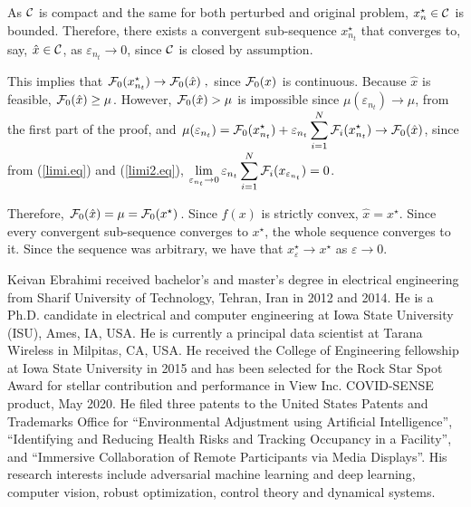 \documentclass[journal,twoside,web]{ieeecolor}
\begin{document}
As ${\cal C}$ is compact and the same for both perturbed and original problem, $x^\star_{n}\in {\cal C}$ is bounded.  Therefore, there exists a convergent sub-sequence $x_{n_t}^\star$ that converges to, say, $\hat{x}\in {\cal C}$, as $\varepsilon_{n_t} \to 0$, since ${\cal C}$ is closed by assumption.

This implies that
${\cal F}_0(x_{n_t}^\star) \to {\cal F}_0(\hat{x})\;,$ since ${\cal F}_0(x)$ is continuous.
Because $\hat{x}$ is feasible, ${\cal F}_0(\hat{x})\geq \mu$.
However,  ${\cal F}_0(\hat{x})>\mu$ is impossible since
$
\mu(\varepsilon_{n_t})\to \mu
$,
from the first part of the proof, and $\displaystyle\mu(\varepsilon_{n_t})={\cal F}_0(x^\star_{n_t})+\varepsilon_{n_t}\sum_{i=1}^N{\cal F}_{i}(x_{n_t}^\star)\to {\cal F}_0(\hat{x})$, since from (\ref{limi.eq}) and (\ref{limi2.eq}), $\displaystyle\lim_{\varepsilon_{n_t}\to 0}
\varepsilon_{n_t}\sum_{i=1}^N{\cal F}_{i}(x_{\varepsilon_{n_t}})=0$\;.

Therefore, ${\cal F}_0(\hat{x})=\mu={\cal F}_0(x^\star)$. Since $f(x)$ is strictly convex, $\hat{x}=x^\star$. Since every convergent sub-sequence converges to $x^\star$, the whole sequence converges to it. Since the sequence was arbitrary, we have that $x^\star_\varepsilon\to x^\star$ as $\varepsilon\to 0$\;.




\begin{IEEEbiography}
{Keivan Ebrahimi} received bachelor's and master's degree in electrical engineering from Sharif University of Technology, Tehran, Iran in 2012 and 2014. He is a Ph.D. candidate in electrical and computer engineering at Iowa State University (ISU), Ames, IA, USA. He is currently a principal data scientist at Tarana Wireless in Milpitas, CA, USA. He received the College of Engineering fellowship at Iowa State University in 2015 and has been selected for the Rock Star Spot Award for stellar contribution and performance in View Inc. COVID-SENSE product, May 2020. He filed three patents to the United States Patents and Trademarks Office for “Environmental Adjustment using Artificial Intelligence”, “Identifying and Reducing Health Risks and Tracking Occupancy in a Facility”, and “Immersive Collaboration of Remote Participants via Media Displays”. His research interests include adversarial machine learning and deep learning, computer vision, robust optimization, control theory and dynamical systems.
\end{IEEEbiography}
\end{document}
